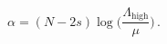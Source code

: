 \begin{equation}
\alpha = (N-2s) \log\Big(\frac{\Lambda_{\mathrm{high}}}{\mu}\Big)\,.
\end{equation}

